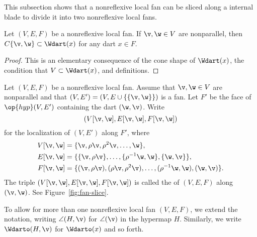 This subsection shows that a nonreflexive local fan can be sliced
along a internal blade to divide it into two nonreflexive local fans.

\begin{lemma}[]
Let $(V,E,F)$ be a nonreflexive local fan.
If $\v,\w\in V$ are nonparallel, then $C\{\v,\w\} \subset
\Wdart(x)$ for any dart $x\in F$.
\end{lemma}
%

\begin{proof} This is an elementary consequence of
the cone shape of $\Wdart(x)$,  the condition that $V\subset
\Wdart(x)$, and definitions.
\end{proof}






\begin{definition}[slice]
 Let $(V,E,F)$ be a nonreflexive local fan.  Assume that
$\v,\w\in V$ are nonparallel and that $(V,E')=(V,E\cup
\{\{\v,\w\}\})$ is a fan.  Let $F'$ be the face of $\op{hyp}(V,E')$
containing the dart $(\w,\v)$.  Write
\[ (V[\v,\w],E[\v,\w],F[\v,\w])\] 
for the localization of $(V,E')$ along $F'$, where
\begin{align*}
  V[\v,\w] &= \{\v,\rho \v,\rho^2 \v,\ldots,\w\},\\
  E[\v,\w] &= \{\{\v,\rho \v\},\ldots,\{\rho^{-1}\w,\w\},\{\w,\v\}\},\\
  F[\v,\w] &= \{(\v,\rho \v),(\rho \v,\rho^2 \v),
 \ldots,(\rho^{-1}\w,\w),(\w,\v)\}.
\end{align*}
The triple $(V[\v,\w],E[\v,\w],F[\v,\w])$ is called the
 of $(V,E,F)$ along $(\v,\w)$.
See Figure~\ref{fig:fan-slice}.
\end{definition}
%
%

\figSXYGYPC %

To allow for more than one nonreflexive local fan $(V,E,F)$, we  extend
the notation, writing $\angle(H,\v)$ for $\angle(\v)$ in the hypermap
$H$.  Similarly, we write $\Wdarto(H,\v)$ for $\Wdarto(x)$ and so
forth.  %
%
%


